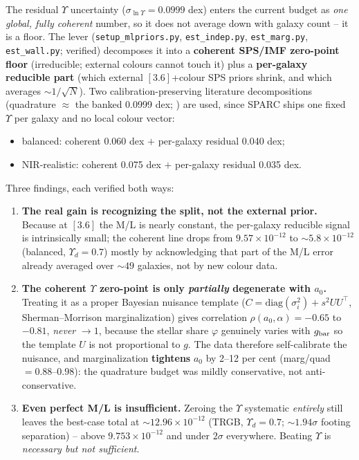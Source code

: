 \documentclass[fleqn,usenatbib]{mnras}
\begin{document}
The residual $\Upsilon$ uncertainty ($\sigma_{\ln\Upsilon}=0.0999$ dex) enters the current budget as \emph{one global, fully coherent} number, so it does not average down with galaxy count -- it is a floor. The lever (\texttt{setup\_mlpriors.py}, \texttt{est\_indep.py}, \texttt{est\_marg.py}, \texttt{est\_wall.py}; verified) decomposes it into a \textbf{coherent SPS/IMF zero-point floor} (irreducible; external colours cannot touch it) plus a \textbf{per-galaxy reducible part} (which external $[3.6]$+colour SPS priors shrink, and which averages ${\sim}1/\sqrt N$). Two calibration-preserving literature decompositions (quadrature $\approx$ the banked 0.0999 dex; \citealt{Schombert2019,Meidt2014,McGaughSchombert2014,BelldeJong2001}) are used, since SPARC ships one fixed $\Upsilon$ per galaxy and no local colour vector:
\begin{itemize}
\item balanced: coherent 0.060 dex $+$ per-galaxy residual 0.040 dex;
\item NIR-realistic: coherent 0.075 dex $+$ per-galaxy residual 0.035 dex.
\end{itemize}

Three findings, each verified both ways:
\begin{enumerate}
\item \textbf{The real gain is recognizing the split, not the external prior.} Because at $[3.6]$ the M/L is nearly constant, the per-galaxy reducible signal is intrinsically small; the coherent line drops from $9.57\times10^{-12}$ to ${\sim}5.8\times10^{-12}$ (balanced, $\Upsilon_d=0.7$) mostly by acknowledging that part of the M/L error already averaged over ${\sim}49$ galaxies, not by new colour data.
\item \textbf{The coherent $\Upsilon$ zero-point is only \emph{partially} degenerate with $a_0$.} Treating it as a proper Bayesian nuisance template ($C=\mathrm{diag}(\sigma_i^2)+s^2 UU^\top$, Sherman--Morrison marginalization) gives correlation $\rho(a_0,\alpha)=-0.65$ to $-0.81$, \emph{never} $\to1$, because the stellar share $\varphi$ genuinely varies with $g_{\rm bar}$ so the template $U$ is not proportional to $g$. The data therefore self-calibrate the nuisance, and marginalization \textbf{tightens} $a_0$ by 2--12 per cent (marg/quad $=0.88$--$0.98$): the quadrature budget was mildly conservative, not anti-conservative.
\item \textbf{Even perfect M/L is insufficient.} Zeroing the $\Upsilon$ systematic \emph{entirely} still leaves the best-case total at ${\sim}12.96\times10^{-12}$ (TRGB, $\Upsilon_d=0.7$; ${\sim}1.94\sigma$ footing separation) -- above $9.753\times10^{-12}$ and under $2\sigma$ everywhere. Beating $\Upsilon$ is \emph{necessary but not sufficient}.
\end{enumerate}
\end{document}
